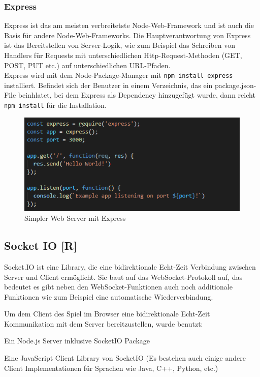 \subsubsection{Express}
Express ist das am meisten verbreitetste Node-Web-Framework und ist auch die Basis für andere Node-Web-Frameworks. Die Hauptverantwortung
von Express ist das Bereitstellen von Server-Logik, wie zum Beispiel das Schreiben von Handlers für Requests mit unterschiedlichen Http-Request-Methoden (GET, POST, PUT etc.) auf unterschiedlichen URL-Pfaden. \cite{node_environment} \\
Express wird mit dem Node-Package-Manager mit \texttt{npm install express} installiert. Befindet sich der Benutzer in
einem Verzeichnis, das ein package.json-File beinhlatet, bei dem Express als Dependency hinzugefügt wurde, dann reicht \texttt{npm install} für die Installation.

\begin{figure}[H]
    \centering
    \includegraphics[scale=1]{pics/Express.PNG}
    \caption{Simpler Web Server mit Express}
\end{figure}

\subsection{Socket IO [R]}

Socket.IO ist eine Library, die eine bidirektionale Echt-Zeit Verbindung zwischen Server und Client ermöglicht. Sie baut auf das WebSocket-Protokoll auf, das bedeutet es gibt neben den WebSocket-Funktionen auch noch additionale Funktionen wie zum Beispiel eine automatische Wiederverbindung.

Um dem Client des Spiel im Browser eine bidirektionale Echt-Zeit Kommunikation mit dem Server bereitzustellen, wurde benutzt:
\begin{compactitem}
    \item Ein Node.js Server inklusive SocketIO Package
    \item Eine JavaScript Client Library von SocketIO (Es bestehen auch einige andere Client Implementationen für Sprachen wie Java, C++, Python, etc.)
\end{compactitem}

